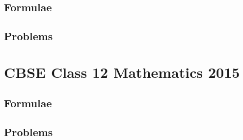 \documentclass[journal]{IEEEtran}
\begin{document}
\subsection{Formulae}

\newpage
\subsection{Problems}


\newpage
\section{CBSE Class 12 Mathematics 2015}
\subsection{Formulae}

\newpage
\subsection{Problems}

\end{document}
